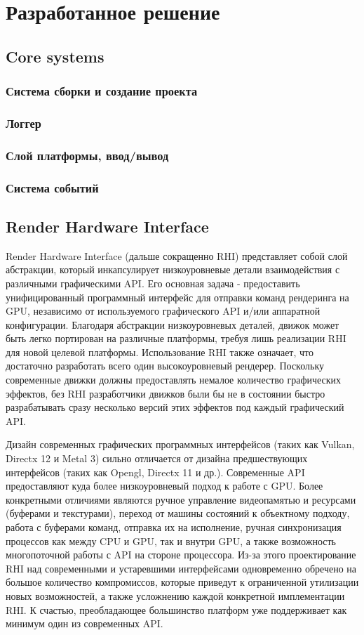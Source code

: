 \section{Разработанное решение}

\subsection{Core systems}
\subsubsection{Система сборки и создание проекта}
\subsubsection{Логгер}
\subsubsection{Слой платформы, ввод/вывод}
\subsubsection{Система событий}

\subsection{Render Hardware Interface}
Render Hardware Interface (дальше сокращенно RHI) представляет собой слой абстракции, который инкапсулирует низкоуровневые детали взаимодействия с различными графическими API. Его основная задача - предоставить унифицированный программный интерфейс для отправки команд рендеринга на GPU, независимо от используемого графического API и/или аппаратной конфигурации. Благодаря абстракции низкоуровневых деталей, движок может быть легко портирован на различные платформы, требуя лишь реализации RHI для новой целевой платформы. Использование RHI также означает, что достаточно разработать всего один высокоуровневый рендерер. Поскольку современные движки должны предоставлять немалое количество графических эффектов, без RHI разработчики движков были бы не в состоянии быстро разрабатывать сразу несколько версий этих эффектов под каждый графический API.

Дизайн современных графических программных интерфейсов (таких как Vulkan, Directx 12 и Metal 3) сильно отличается от дизайна предшествующих интерфейсов (таких как Opengl, Directx 11 и др.). Современные API предоставляют куда более низкоуровневый подход к работе с GPU. Более конкретными отличиями являются ручное управление видеопамятью и ресурсами (буферами и текстурами), переход от машины состояний к объектному подходу, работа с буферами команд, отправка их на исполнение, ручная синхронизация процессов как между CPU и GPU, так и внутри GPU, а также возможность многопоточной работы с API на стороне процессора. Из-за этого проектирование RHI над современными и устаревшими интерфейсами одновременно обречено на большое количество компромиссов, которые приведут к ограниченной утилизации новых возможностей, а также усложнению каждой конкретной имплементации RHI. К счастью, преобладающее большинство платформ уже поддерживает как минимум один из современных API.

